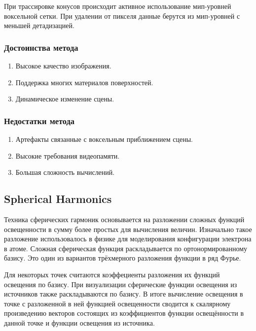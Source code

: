 \documentclass[12pt,fleqn]{article}
\begin{document}
При трассировке конусов происходит активное использование мип-уровней воксельной сетки. При удалении от пикселя данные берутся из мип-уровней с меньшей детадизацией.

\subsubsection{Достоинства метода}

\begin{enumerate}

\item Высокое качество изображения.

\item Поддержка многих материалов поверхностей.

\item Динамическое изменение сцены.

\end{enumerate}

\subsubsection{Недостатки метода}

\begin{enumerate}

\item Артефакты связанные с воксельным приближением сцены.

\item Высокие требования видеопамяти.

\item Большая сложность вычислений.

\end{enumerate}

\subsection{Spherical Harmonics}

Техника сферических гармоник \cite{SphericalHarmonics} основывается на разложении сложных функций освещенности в сумму более простых для вычисления величин. Изначально такое разложение использовалось в физике для моделирования конфигурации электрона в атоме. Сложная сферическая функция раскладывается по ортонормированному базису. Это один из вариантов трёхмерного разложения функции в ряд Фурье.

Для некоторых точек считаются коэффециенты разложения их функций освещения по базису. При визуализации сферические функции освещения из источников также раскладываются по базису. В итоге вычисление освещения в точке с разложенной в ней функцией освещенности сводится к скалярному произведению векторов состоящих из коэффициентов функции освещённости в данной точке и функции освещения из источника.
\end{document}
